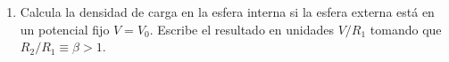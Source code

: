 \documentclass[]{article}
\numberwithin{equation}{section}
\newcommand{\0}{\textcolor{gray}{0}}
\begin{document}
\begin{enumerate}
\begin{align*}
		& \frac{1}{r'^2} (2\ell + 1)\left(\frac{R_1^{(2\ell + 1)}}{R_2^{(2\ell + 1)}} - 1\right) = - \frac{4\pi}{C_\ell r'^2}
	\end{align*}
	\begin{equation*}
		C_\ell = \frac{4\pi }{(2\ell + 1)} \left(1 - \frac{R_1^{(2\ell + 1)}}{R_2^{(2\ell + 1)}}\right)^{-1}
	\end{equation*}
	Por lo que la función de Green:
	\begin{equation*}
		G(r,r') = \sum_{\ell=0}^{\infty} \left(1 - \frac{R_1^{(2\ell + 1)}}{R_2^{(2\ell + 1)}}\right)^{-1} \cdot \left(r_<^{\ell} - \frac{R_1^{(2\ell + 1)}}{r_<^{(\ell + 1)}}\right) \cdot \left(\frac{1}{r_>^{(\ell + 1)}} - \frac{r_>^{\ell}}{R_2^{(2\ell + 1)}}\right)  P_{\ell}(\cos\gamma)
	\end{equation*}
	
	\item Calcula la densidad de carga en la esfera interna si la esfera externa está en un potencial fijo \(V = V_0\). Escribe el resultado en unidades \(V/R_1\) tomando que \(R_2 / R_1 \equiv \beta > 1\).
	

\end{enumerate}
\end{document}
